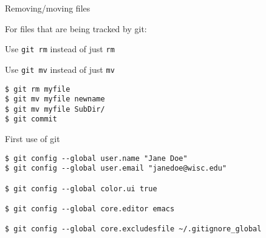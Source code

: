 \documentclass[aspectratio=169,12pt,t]{beamer}
\begin{document}
\begin{frame}[fragile]{Removing/moving files}

\vspace{24pt}

For files that are being tracked by git:

\bigskip

\hspace{1em} Use {\tt \hilit git rm} instead of just {\tt rm}

\hspace{1em} Use {\tt \hilit git mv} instead of just {\tt mv}

\bigskip

\begin{lstlisting}
$ git rm myfile
$ git mv myfile newname
$ git mv myfile SubDir/
$ git commit
\end{lstlisting}

\end{frame}




\begin{frame}[fragile]{First use of git}

\vspace{24pt}

\begin{lstlisting}
$ git config --global user.name "Jane Doe"
$ git config --global user.email "janedoe@wisc.edu"

$ git config --global color.ui true

$ git config --global core.editor emacs

$ git config --global core.excludesfile ~/.gitignore_global
\end{lstlisting}

\end{frame}
\end{document}
